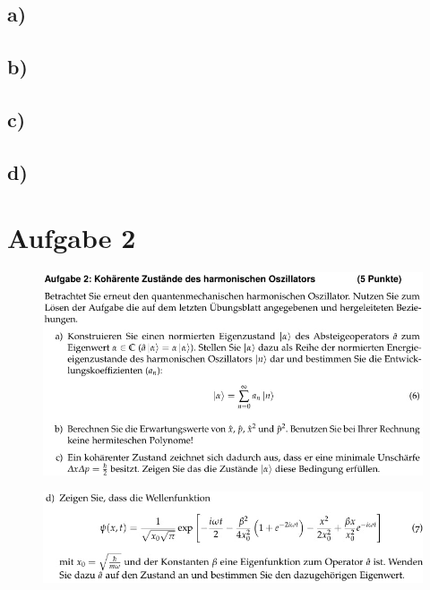 \subsection{a)}

\subsection{b)}

\subsection{c)}

\subsection{d)}

\section{Aufgabe 2}

    \begin{figure}[H]
        \centering
        \includegraphics[width=\textwidth]{images/Aufgabe2abc.jpg}
        \label{fig:3}
    \end{figure}
    \begin{figure}[H]
        \centering
        \includegraphics[width=\textwidth]{images/Aufgabe2d.jpg}
        \label{fig:4}
    \end{figure}

